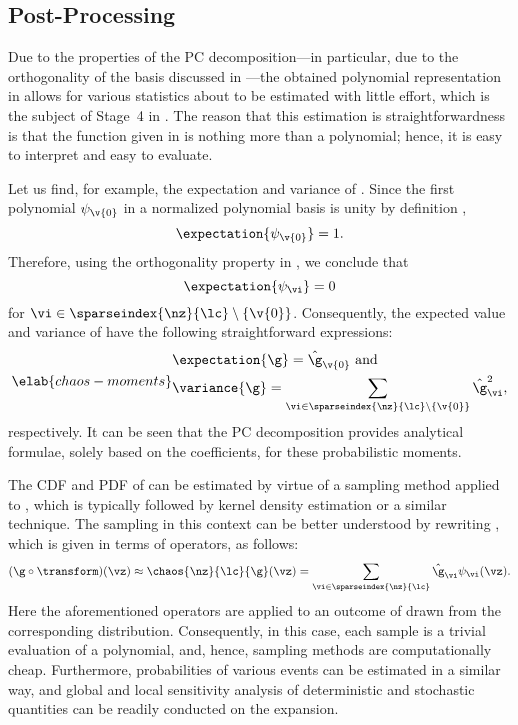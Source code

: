 \subsection{Post-Processing}

Due to the properties of the \ac{PC} decomposition---in particular, due to the
orthogonality of the basis discussed in ---the obtained
polynomial representation in  allows for various
statistics about \g to be estimated with little effort, which is the subject of
Stage~4 in . The reason that this estimation is
straightforwardness is that the function given in  is
nothing more than a polynomial; hence, it is easy to interpret and easy to
evaluate.

Let us find, for example, the expectation and variance of \g. Since the first
polynomial $\psi_{\v{0}}$ in a normalized polynomial basis is unity by
definition \cite{xiu2010},
\[
  \expectation{\psi_{\v{0}}} = 1.
\]
Therefore, using the orthogonality property in , we
conclude that
\[
  \expectation{\psi_{\vi}} = 0
\]
for $\vi \in \sparseindex{\nz}{\lc} \setminus \{ \v{0} \}$. Consequently, the
expected value and variance of \g have the following straightforward
expressions:
\begin{equation} \elab{chaos-moments}
  \begin{split}
    & \expectation{\g} = \hat{\g}_{\v{0}} \text{ and} \\
    & \variance{\g} = \sum_{\vi \in \sparseindex{\nz}{\lc} \setminus \{ \v{0} \}} \hat{\g}_{\vi}^2,
  \end{split}
\end{equation}
respectively. It can be seen that the \ac{PC} decomposition provides analytical
formulae, solely based on the coefficients, for these probabilistic moments.

The \ac{CDF} and \ac{PDF} of \g  can be estimated by virtue of a sampling method
applied to , which is typically followed by kernel density
estimation \cite{hastie2013} or a similar technique. The sampling in this
context can be better understood by rewriting , which is
given in terms of operators, as follows:
\[
  (\g \circ \transform)(\vz) \approx \chaos{\nz}{\lc}{\g}(\vz)
  = \sum_{\vi \in \sparseindex{\nz}{\lc}} \hat{\g}_{\vi} \psi_{\vi}(\vz).
\]
Here the aforementioned operators are applied to an outcome of \vz drawn from
the corresponding distribution. Consequently, in this case, each sample is a
trivial evaluation of a polynomial, and, hence, sampling methods are
computationally cheap. Furthermore, probabilities of various events can be
estimated in a similar way, and global and local sensitivity analysis of
deterministic and stochastic quantities can be readily conducted on the
expansion.


